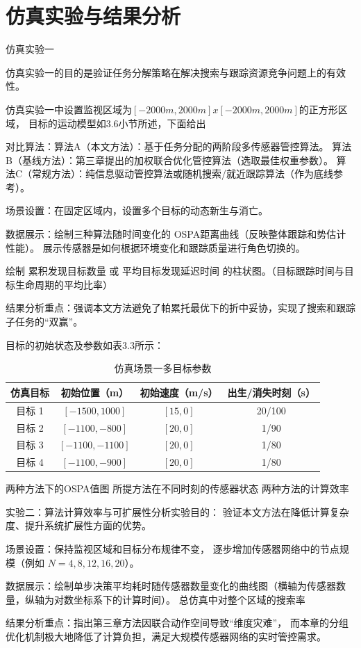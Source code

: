 \section{仿真实验与结果分析}
仿真实验一

仿真实验一的目的是验证任务分解策略在解决搜索与跟踪资源竞争问题上的有效性。

仿真实验一中设置监视区域为$[-2000m,2000m]x[-2000m,2000m]$的正方形区域，
目标的运动模型如3.6小节所述，下面给出

对比算法：算法A（本文方法）：基于任务分配的两阶段多传感器管控算法。
算法B（基线方法）：第三章提出的加权联合优化管控算法（选取最佳权重参数）。
算法C（常规方法）：纯信息驱动管控算法或随机搜索/就近跟踪算法（作为底线参考）。

场景设置：在固定区域内，设置多个目标的动态新生与消亡。

数据展示：绘制三种算法随时间变化的 OSPA距离曲线（反映整体跟踪和势估计性能）。
展示传感器是如何根据环境变化和跟踪质量进行角色切换的。

绘制 累积发现目标数量 或 平均目标发现延迟时间 的柱状图。（目标跟踪时间与目标生命周期的平均比率）

结果分析重点：强调本文方法避免了帕累托最优下的折中妥协，实现了搜索和跟踪子任务的“双赢”。

目标的初始状态及参数如表3.3所示：
\begin{table}[H]
    \centering
    \caption{仿真场景一多目标参数}
    \label{tab:scenario_1}
    \begin{tabular}{cccc}
        \toprule[1.5pt] %
        仿真目标 & 初始位置（m） & 初始速度（m/s） & 出生/消失时刻（s） \\
        \midrule[0.5pt] %
        目标 1 & $[-1500, 1000]$ & $[15, 0]$ & 20/100 \\
        目标 2 & $[-1100, -800]$ & $[20, 0]$ & 1/90 \\
        目标 3 & $[-1100, -1100]$ & $[20, 0]$ & 1/80 \\
        目标 4 & $[-1100, -900]$ & $[20, 0]$ & 1/80 \\
        \bottomrule[1.5pt] %
    \end{tabular}
\end{table}

两种方法下的OSPA值图
所提方法在不同时刻的传感器状态
两种方法的计算效率



实验二：算法计算效率与可扩展性分析实验目的：
验证本文方法在降低计算复杂度、提升系统扩展性方面的优势。

场景设置：保持监视区域和目标分布规律不变，
逐步增加传感器网络中的节点规模（例如 $N = 4, 8, 12, 16, 20$）。

数据展示：绘制单步决策平均耗时随传感器数量变化的曲线图（横轴为传感器数量，纵轴为对数坐标系下的计算时间）。
总仿真中对整个区域的搜索率

结果分析重点：指出第三章方法因联合动作空间导致“维度灾难”，
而本章的分组优化机制极大地降低了计算负担，满足大规模传感器网络的实时管控需求。
